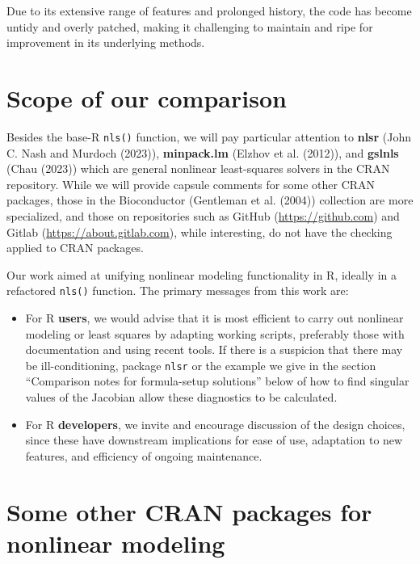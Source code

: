 Due to its extensive range of features and prolonged history, the code has become untidy and overly patched, making it challenging to maintain and ripe for improvement in its underlying methods.

\hypertarget{scope-of-our-comparison}{%
\section{Scope of our comparison}\label{scope-of-our-comparison}}

Besides the base-R \texttt{nls()} function, we will pay particular attention
to \textbf{nlsr} (John C. Nash and Murdoch (2023)),
\textbf{minpack.lm} (Elzhov et al. (2012)), and \textbf{gslnls} (Chau (2023)) which are
general nonlinear least-squares solvers in the CRAN repository.
While we will provide capsule comments for some other CRAN packages,
those in the Bioconductor (Gentleman et al. (2004)) collection are more
specialized, and those on repositories such as
GitHub (\url{https://github.com}) and Gitlab (\url{https://about.gitlab.com}),
while interesting, do not have the checking applied to CRAN packages.

Our work aimed at unifying nonlinear modeling functionality in R,
ideally in a refactored \texttt{nls()} function. The primary messages from this work
are:

\begin{itemize}
\item
  For R \textbf{users}, we would advise that it is most efficient to carry out
  nonlinear modeling or least squares by adapting working scripts, preferably those
  with documentation and using recent tools. If there is a suspicion that there
  may be ill-conditioning, package \texttt{nlsr} or the example we give in the
  section ``Comparison notes for formula-setup solutions'' below of how to
  find singular values of the Jacobian allow these diagnostics to be calculated.
\item
  For R \textbf{developers}, we invite and encourage discussion of the design choices,
  since these
  have downstream implications for ease of use, adaptation to new features, and
  efficiency of ongoing maintenance.
\end{itemize}

\hypertarget{some-other-cran-packages-for-nonlinear-modeling}{%
\section{Some other CRAN packages for nonlinear modeling}\label{some-other-cran-packages-for-nonlinear-modeling}}

